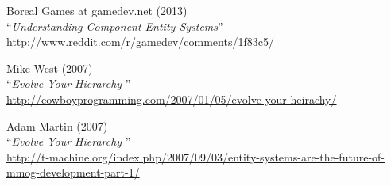 \begin{thebibliography}{9}
	Boreal Games at gamedev.net (2013) \\ 
	``\textit{Understanding Component-Entity-Systems}'' \\
	\href{http://www.reddit.com/r/gamedev/comments/1f83c5/}{http://www.reddit.com/r/gamedev/comments/1f83c5/}
	
	Mike West (2007) \\ 
	``\textit{Evolve Your Hierarchy }'' \\
	\href{http://cowboyprogramming.com/2007/01/05/evolve-your-heirachy/}{http://cowboyprogramming.com/2007/01/05/evolve-your-heirachy/}

	Adam Martin (2007) \\ 
	``\textit{Evolve Your Hierarchy }'' \\
	\href{http://t-machine.org/index.php/2007/09/03/entity-systems-are-the-future-of-mmog-development-part-1/}{http://t-machine.org/index.php/2007/09/03/entity-systems-are-the-future-of-mmog-development-part-1/}
	


\end{thebibliography}